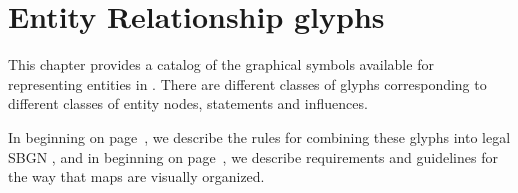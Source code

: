 
\chapter{Entity Relationship glyphs}
\label{chp:glyph}

This chapter provides a catalog of the graphical symbols available for representing entities in \ERms.  There are different classes of glyphs corresponding to different classes of entity nodes, statements and influences.

In  beginning on page~\pageref{chp:grammar}, we describe the rules for combining these glyphs into legal SBGN \ERs, and in  beginning on page~\pageref{chp:layout}, we describe requirements and guidelines for the way that maps are visually organized.








